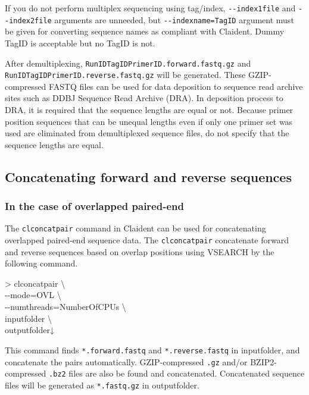 \documentclass[titlepage,10pt,a4paper,english]{jsbook}
\newenvironment{cmd}{\begin{oframed}\raggedright\ttfamily\footnotesize\setlength{\baselineskip}{1.4em}}{\end{oframed}\vspace{-1em}}
\begin{document}
If you do not perform multiplex sequencing using tag/index, \texttt{{-}{-}index1file} and \texttt{{-}{-}index2file} arguments are unneeded, but \texttt{{-}{-}indexname=TagID} argument must be given for converting sequence names as compliant with Claident.
Dummy TagID is acceptable but no TagID is not.

After demultiplexing, \texttt{RunID{\textunderscore}{\textunderscore}TagID{\textunderscore}{\textunderscore}PrimerID.forward.fastq.gz} and \texttt{RunID{\textunderscore}{\textunderscore}TagID{\textunderscore}{\textunderscore}PrimerID.reverse.fastq.gz} will be generated.
These GZIP-compressed FASTQ files can be used for data deposition to sequence read archive sites such as DDBJ Sequence Read Archive (DRA).
In deposition process to DRA, it is required that the sequence lengths are equal or not.
Because primer position sequences that can be unequal lengths even if only one primer set was used are eliminated from demultiplexed sequence files, do not specify that the sequence lengths are equal.

\subsection{Concatenating forward and reverse sequences}\label{subsection:concatenatingpairedend}

\subsubsection{In the case of overlapped paired-end}

The \texttt{clconcatpair} command in Claident can be used for concatenating overlapped paired-end sequence data.
The \texttt{clconcatpair} concatenate forward and reverse sequences based on overlap positions using VSEARCH by the following command.

\begin{cmd}
{\textgreater} clconcatpair {\textbackslash}\\
{-}{-}mode=OVL {\textbackslash}\\
{-}{-}numthreads=NumberOfCPUs {\textbackslash}\\
inputfolder {\textbackslash}\\
outputfolder↓
\end{cmd}

This command finds \texttt{*.forward.fastq} and \texttt{*.reverse.fastq} in inputfolder, and concatenate the pairs automatically.
GZIP-compressed \texttt{.gz} and/or BZIP2-compressed \texttt{.bz2} files are also be found and concatenated.
Concatenated sequence files will be generated as \texttt{*.fastq.gz} in outputfolder.
\end{document}
